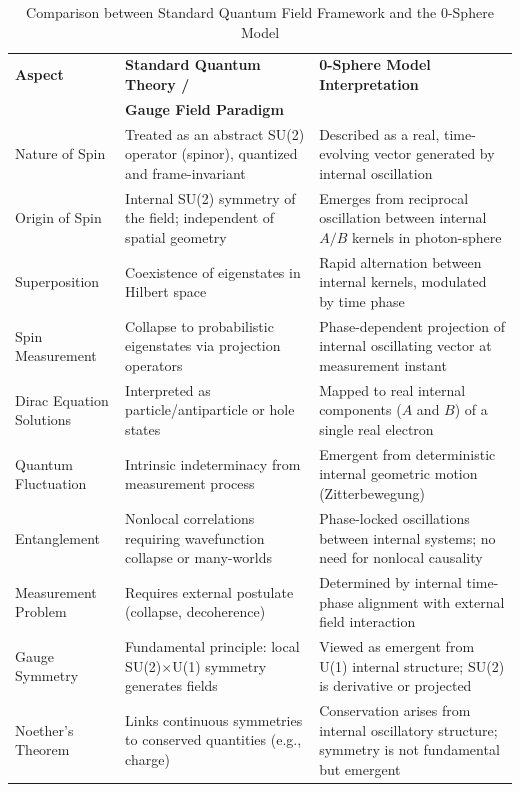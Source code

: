 \documentclass[%
 reprint,
 amsmath,amssymb,
 aps,
]{revtex4-1}
\numberwithin{equation}{section}%
\begin{document}
\begin{table}[t!]
\caption{Comparison between Standard Quantum Field Framework and the 0-Sphere Model}
\label{tab:comparison_extended}
\renewcommand{\arraystretch}{1.3}
\begin{tabular}{p{4.8cm}p{6.2cm}p{6.2cm}}
\toprule
\textbf{Aspect} & \textbf{Standard Quantum Theory /} & \textbf{0-Sphere Model Interpretation} \\
& \textbf{Gauge Field Paradigm} & \\
\midrule
Nature of Spin & Treated as an abstract SU(2) operator (spinor), quantized and frame-invariant & Described as a real, time-evolving vector generated by internal oscillation \\
\addlinespace[0.3cm]
Origin of Spin & Internal SU(2) symmetry of the field; independent of spatial geometry & Emerges from reciprocal oscillation between internal $A/B$ kernels in photon-sphere \\
\addlinespace[0.3cm]
Superposition & Coexistence of eigenstates in Hilbert space & Rapid alternation between internal kernels, modulated by time phase \\
\addlinespace[0.3cm]
Spin Measurement & Collapse to probabilistic eigenstates via projection operators & Phase-dependent projection of internal oscillating vector at measurement instant \\
\addlinespace[0.3cm]
Dirac Equation Solutions & Interpreted as particle/antiparticle or hole states & Mapped to real internal components ($A$ and $B$) of a single real electron \\
\addlinespace[0.3cm]
Quantum Fluctuation & Intrinsic indeterminacy from measurement process & Emergent from deterministic internal geometric motion (Zitterbewegung) \\
\addlinespace[0.3cm]
Entanglement & Nonlocal correlations requiring wavefunction collapse or many-worlds & Phase-locked oscillations between internal systems; no need for nonlocal causality \\
\addlinespace[0.3cm]
Measurement Problem & Requires external postulate (collapse, decoherence) & Determined by internal time-phase alignment with external field interaction \\
\addlinespace[0.3cm]
Gauge Symmetry & Fundamental principle: local SU(2)$\times$U(1) symmetry generates fields & Viewed as emergent from U(1) internal structure; SU(2) is derivative or projected \\
\addlinespace[0.3cm]
Noether’s Theorem & Links continuous symmetries to conserved quantities (e.g., charge) & Conservation arises from internal oscillatory structure; symmetry is not fundamental but emergent \\

\end{tabular}
\end{table}
\end{document}

